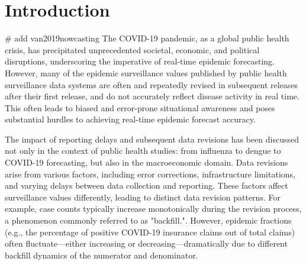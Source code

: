 \section{Introduction}

# add van2019nowcasting
The COVID-19 pandemic, as a global public health crisis, has precipitated unprecedented societal, economic, and political disruptions, underscoring the imperative of real-time epidemic forecasting. However, many of the epidemic surveillance values published by public health surveillance data systems are often and repeatedly revised in subsequent releases after their first release, and do not accurately reflect disease activity in real time. This often leads to biased and error-prone situational awareness\cite{McGough2020}\cite{Rosenfeld2021} and poses substantial hurdles to achieving real-time epidemic forecast accuracy.

The impact of reporting delays and subsequent data revisions has been discussed not only in the context of public health studies: from influenza\cite{chakraborty2018know} to dengue \cite{rangarajan2019forecasting} to COVID-19 forecasting\cite{rodriguez2021deepcovid}\cite{adiga2020mathematical}, but also in the macroeconomic domain\cite{clements2019data}. Data revisions arise from various factors, including error corrections, infrastructure limitations, and varying delays between data collection and reporting\cite{reich2019collaborative}\cite{Chakraborty2018}. These factors affect surveillance values differently, leading to distinct data revision patterns. For example, case counts typically increase monotonically during the revision process, a phenomenon commonly referred to as "backfill.". However, epidemic fractions (e.g., the percentage of positive COVID-19 insurance claims out of total claims) often fluctuate—either increasing or decreasing—dramatically due to different backfill dynamics of the numerator and denominator.


